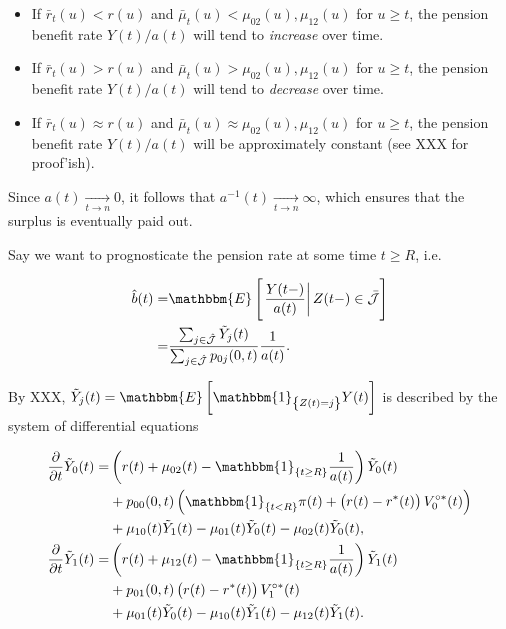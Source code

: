 \documentclass{book}
\newcommand{\1}[1]{\mathbbm{1}_{\left\lbrace #1 \right\rbrace}}
\newcommand{\expec}[1][def]{\mathbbm{E} \left[ #1 \right]}
\newcommand{\econd}[2][def]{\mathbbm{E} \left[ \left. #1 \right| #2 \right]}
\theoremstyle{break}
\theoremstyle{remark}
\numberwithin{equation}{section}
\begin{document}
\begin{itemize}
	\item If $\bar{r}_t(u)<r(u)$ and $\bar{\mu}_t(u)<\mu_{02}(u),\mu_{12}(u)$ for $u \geq t$, the pension benefit rate $Y(t)/a(t)$ will tend to \textit{increase} over time.
	\item If $\bar{r}_t(u)>r(u)$ and $\bar{\mu}_t(u)>\mu_{02}(u),\mu_{12}(u)$ for $u \geq t$, the pension benefit rate $Y(t)/a(t)$ will tend to \textit{decrease} over time.
	\item If $\bar{r}_t(u)\approx r(u)$ and $\bar{\mu}_t(u)\approx \mu_{02}(u),\mu_{12}(u)$ for $u \geq t$, the pension benefit rate $Y(t)/a(t)$ will be approximately constant (see XXX for proof'ish).
\end{itemize}

Since $a(t) \underset{t \to n}{\longrightarrow} 0$, it follows that $a^{-1}(t) \underset{t \to n}{\longrightarrow} \infty$, which ensures that the surplus is eventually paid out.

Say we want to prognosticate the pension rate at some time $t \geq R$, i.e.

\begin{align*}
	\hat{b}(t) =& \econd[\frac{Y(t-)}{a(t)}]{Z(t-) \in \bar{\mathcal{J}}} \\
	=&\frac{\sum_{j \in \hat{\mathcal{J}}} \tilde{Y}_j(t)}{\sum_{j \in \hat{\mathcal{J}}} p_{0j}(0,t)} \frac{1}{a(t)}.
\end{align*}

By XXX, $\tilde{Y}_j(t) = \expec[\1{Z(t)=j} Y(t)]$ is described by the system of differential equations

\begin{align*}
	\frac{\partial}{\partial t} \tilde{Y}_0(t) =& \left( r(t) + \mu_{02}(t) - \1{t \geq R} \frac{1}{a(t)}\right) \tilde{Y}_0(t) \\
	&+ p_{00}(0,t) \left( \1{t<R} \pi(t) + \left( r(t) - r^*(t) \right) V_{0}^{\circ*}(t) \right) \\
	&+ \mu_{10}(t) \tilde{Y}_1(t) - \mu_{01}(t) \tilde{Y}_0(t) - \mu_{02}(t) \tilde{Y}_0(t), \\
	\frac{\partial}{\partial t} \tilde{Y}_1(t) =& \left( r(t) + \mu_{12}(t) - \1{t \geq R} \frac{1}{a(t)}\right) \tilde{Y}_1(t) \\
	&+ p_{01}(0,t) \left( r(t) - r^*(t) \right) V_{1}^{\circ*}(t) \\
	&+ \mu_{01}(t) \tilde{Y}_0(t) - \mu_{10}(t) \tilde{Y}_1(t) - \mu_{12}(t) \tilde{Y}_1(t).
\end{align*}
\end{document}
